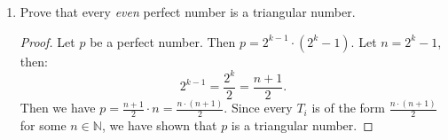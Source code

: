 \documentclass[12pt]{amsart}
\begin{document}
\begin{enumerate}
\begin{enumerate}
\begin{enumerate}
\item Under what conditions will $T_i$ be odd?
\subsection*{Solution}
$T_i$ will be odd if $i \mod 4 \equiv 1 \text{ or } 2$.

\item Prove that when represented in base ten, no triangular number will end in 4 or 7.
\begin{proof}
Recall that every $T_i$ is of the form $\tfrac {n(n+1)} 2$. We will proceed by contradiction. Suppose to the contrary that $\frac {n(n+1)} 2 \mod 10 \equiv 4$ and $\frac {n(n+1)} 2 \mod 10 \equiv 7$. First:
\[ \frac {n(n+1)} 2 \mod 10 \equiv 4. \]
Then we have the following:
\begin{align*}
\frac {n(n+1)} 2 \mod 10 &\equiv 4 \\
n(n+1) \mod 10 &\equiv 8 \\
n\mod 10 \cdot (n+1) \mod 10 &\equiv 8 \\
n\mod 10 \cdot n \mod 10 +1 \mod 10 &\equiv 8 \\
n\mod 10 \cdot n \mod 10 &\equiv 7 \\
n^2 \mod 10&\equiv 7
\end{align*}
I claim we have reached a contradiction, since $n^2$ cannot end in 7. Next, suppose the following:
\[ \frac {n(n+1)} 2 \mod 10 \equiv 7. \]
Similarly, we have:
\begin{align*}
\frac {n(n+1)} 2 \mod 10 &\equiv 7 \\
(n^2 + 1) \mod 10 &\equiv 4 \\
n^2 \mod 10 + 1 \mod 10 &\equiv 4 \\
n^2 \mod 10 &\equiv 3
\end{align*}
Again, I claim we've reached a contradiction, because $n^2$ cannot end in 3.
\end{proof}

\end{enumerate}

\item Prove that every {\it even} perfect number is a triangular number.
\begin{proof}
Let $p$ be a perfect number. Then $p = 2^{k-1} \cdot (2^k - 1)$. Let $n=2^k-1$, then:
\[ 2^{k-1} = \frac {2^k} 2 = \frac {n+1} 2. \]
Then we have $p = \frac {n+1} 2 \cdot n = \frac {n\cdot(n+1)} 2$. Since every $T_i$ is of the form $\frac {n\cdot(n+1)} 2$ for some $n\in\mathbb N$, we have shown that $p$ is a triangular number.
\end{proof}


\end{enumerate}
\end{enumerate}
\end{document}
